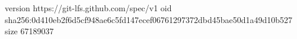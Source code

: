 version https://git-lfs.github.com/spec/v1
oid sha256:0d410eb2f6d5cf948ae6c5fd147ecef06761297372dbd45bae50d1a49d10b527
size 67189037
